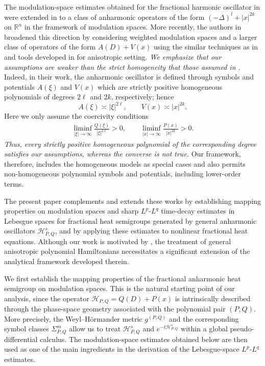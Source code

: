 \documentclass[12pt, reqno]{amsart}
\theoremstyle{definition}
\theoremstyle{remark}
\numberwithin{equation}{section}
\begin{document}
 The modulation-space estimates obtained for the  fractional harmonic oscillator in \cite{than:hs} were extended in \cite{Cardona} to a class of anharmonic operators of the form $(-\Delta)^l+|x|^{2k}$
on $\mathbb{R}^n$ in the framework of modulation spaces. More recently, the authors in \cite{Dolai, Dolai2} broadened this direction by considering weighted modulation spaces and a larger class of operators of the form $A(D)+V(x)$ using the similar techniques as in \cite{than:hs1,  Cardona} and tools developed in \cite{ Cardona} for anisotropic setting.
{\it We emphasize that our assumptions are weaker than the strict homogeneity that those assumed in \cite{Dolai, Dolai2}}. Indeed, in their work, the anharmonic oscillator is defined through symbols and potentials $A(\xi)$ and $V(x)$ which are strictly positive homogeneous polynomials of degrees $2\ell$ and $2k$, respectively; hence
\[
A(\xi)\asymp |\xi|^{2\ell},
\qquad
V(x)\asymp |x|^{2k}.
\]
Here we only assume the coercivity conditions
\begin{align} \label{corce}
    \liminf_{|\xi|\to\infty}\frac{Q(\xi)}{|\xi|^{2\ell}}>0,
\qquad
\liminf_{|x|\to\infty}\frac{P(x)}{|x|^{2k}}>0.
\end{align}
{\it Thus, every strictly positive homogeneous polynomial of the corresponding degree satisfies our assumptions, whereas the converse is not true.} Our framework, therefore, includes the homogeneous models as special cases and also permits non-homogeneous polynomial symbols and potentials, including lower-order terms.


 

The present paper complements and extends these works by establishing mapping properties on modulation spaces and sharp $L^p$-$L^q$ time-decay estimates in Lebesgue spaces for fractional heat semigroups generated by general anharmonic oscillators $\mathcal H_{P,Q}^s$, and by applying these estimates to nonlinear fractional heat equations.  Although our work is motivated by \cite{than:hs, Cardona, than:hs1}, the treatment of general anisotropic polynomial Hamiltonians necessitates a significant extension of the analytical framework developed therein.


We first establish the mapping properties of the fractional anharmonic heat semigroup on modulation spaces. This is the natural starting point of our analysis, since the operator $\mathcal H_{P,Q}=Q(D)+P(x)$ is intrinsically described through the phase-space geometry associated with the polynomial pair $(P,Q)$. More precisely, the Weyl--H\"ormander metric $g^{(P,Q)}$ and the corresponding symbol classes $\Sigma_{P,Q}^m$ allow us to treat $\mathcal H_{P,Q}^s$ and $e^{-t\mathcal H_{P,Q}^s}$ within a global pseudo-differential calculus. The modulation-space estimates obtained below are then used as one of the main ingredients in the derivation of the Lebesgue-space $L^p$-$L^q$ estimates.
\end{document}
